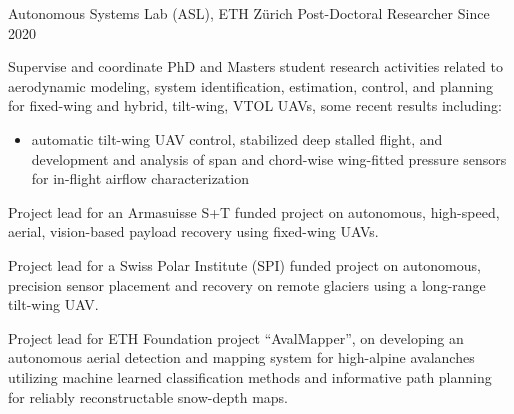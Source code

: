 \label{sec:exp}

\vspace{-8pt}
\begin{cventries}
%
\cvexpentry
  	{Autonomous Systems Lab (ASL), ETH Z\"{u}rich} %
  	{Post-Doctoral Researcher} %
    {} %
    {Since 2020} %
    {
      \begin{cvitems} %
      	\item Supervise and coordinate PhD and Masters student research activities related to aerodynamic modeling, system identification, estimation, control, and planning for fixed-wing and hybrid, tilt-wing, VTOL UAVs, some recent results including:
		\begin{itemize}
			\item automatic tilt-wing UAV control, stabilized deep stalled flight, and development and analysis of span and chord-wise wing-fitted pressure sensors for in-flight airflow characterization
		\end{itemize}		      		
      	\item Project lead for an Armasuisse S+T funded project on autonomous, high-speed, aerial, vision-based payload recovery using fixed-wing UAVs.
      	\item Project lead for a Swiss Polar Institute (SPI) funded project on autonomous, precision sensor placement and recovery on remote glaciers using a long-range tilt-wing UAV.
      	\item Project lead for ETH Foundation project ``AvalMapper'', on developing an autonomous aerial detection and mapping system for high-alpine avalanches utilizing machine learned classification methods and informative path planning for reliably reconstructable snow-depth maps.

\end{cvitems}}
\end{cventries}
